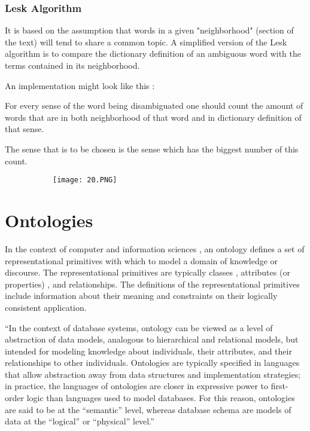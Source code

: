 \documentclass{article}
\begin{document}
\subsubsection{Lesk Algorithm}

It is based on the assumption that words in a given "neighborhood" (section of the text) will tend to share a common topic. A simplified version of the Lesk algorithm is to compare the dictionary definition of an ambiguous word with the terms contained in its neighborhood.

An implementation might look like this : 

For every sense of the word being disambiguated one should count the amount of words that are in both neighborhood of that word and in dictionary definition of that sense.

The sense that is to be chosen is the sense which has the biggest number of this count.


\begin{figure}[ht!]
  \centering
  \begin{subfigure}[b]{0.9\linewidth}
    \texttt{[image: 20.PNG]}
  \end{subfigure}
\end{figure}

\section{Ontologies}

In the context of computer and information sciences , an ontology defines a set of representational primitives with which to model a domain of knowledge or discourse.
The representational primitives are typically classes , attributes (or properties) , and relationships.
The definitions of the representational primitives include information about their meaning and constraints on their logically consistent application.

“In the context of database systems, ontology can be viewed as a level of abstraction of data models, analogous to hierarchical and
relational models, but intended for modeling knowledge about
individuals, their attributes, and their relationships to other
individuals.
Ontologies are typically specified in languages that allow
abstraction away from data structures and implementation
strategies; in practice, the languages of ontologies are closer in
expressive power to first-order logic than languages used to
model databases.
For this reason, ontologies are said to be at the “semantic” level,
whereas database schema are models of data at the “logical” or
“physical” level.”
\end{document}
